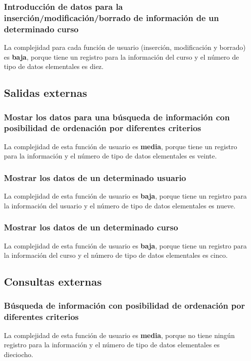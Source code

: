 \documentclass[11pt,a4paper,spanish,twoside]{book}
\begin{document}
\subsubsection{Introducción de datos para la inserción/modificación/borrado 
de información de un determinado curso }
La complejidad para cada función de usuario (inserción, modificación y
borrado) es \textbf{baja}, porque tiene un registro para la información del
curso y el número de tipo de datos elementales es diez.

\subsection{Salidas externas}
\subsubsection{Mostar los datos para una búsqueda de información con
posibilidad de ordenación por diferentes criterios}
La complejidad de esta función de usuario es \textbf{media}, porque tiene un
registro para la información y el número de tipo de datos elementales es veinte.

\subsubsection{Mostrar los datos de un determinado usuario}
La complejidad de esta función de usuario es \textbf{baja}, porque tiene un
registro para la información del usuario y el número de tipo de datos
elementales es nueve.

\subsubsection{Mostrar los datos de un determinado curso}
La complejidad de esta función de usuario es \textbf{baja}, porque tiene un
registro para la información del curso y el número de tipo de datos
elementales es cinco.

\subsection{Consultas externas}
\subsubsection{Búsqueda de información con posibilidad de ordenación por
  diferentes criterios}
La complejidad de esta función de usuario es \textbf{media}, porque no tiene
ningún registro para la información y el número de tipo de datos elementales
es dieciocho.
\end{document}
